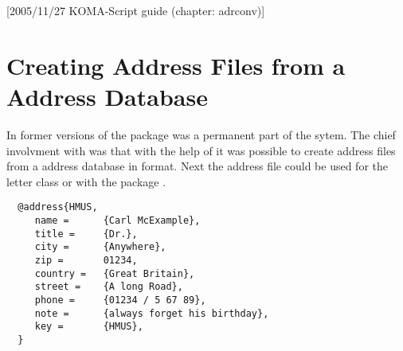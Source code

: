 %
%
%
%
%
%
%
%

[{2005/11/27 KOMA-Script guide (chapter:
  adrconv)}]

\chapter{Creating Address Files from a Address Database}%
%
%
%

In former versions of \KOMAScript{} the package  was a
permanent part of the \KOMAScript{} sytem.  The chief involvment with
\KOMAScript{} was that with the help of  it was possible to
create address files from a address database in \BibTeX{} format.  Next the
address file could be used for the \KOMAScript{} letter class or with the
package .

\begin{lstlisting}
  @address{HMUS,
     name =      {Carl McExample},
     title =     {Dr.},
     city =      {Anywhere},
     zip =       01234,
     country =   {Great Britain},
     street =    {A long Road},
     phone =     {01234 / 5 67 89},
     note =      {always forget his birthday},
     key =       {HMUS},
  }
\end{lstlisting}

